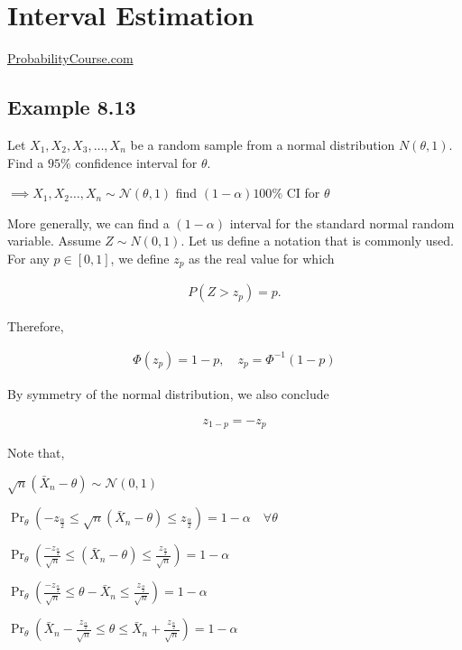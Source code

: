 \documentclass[12pt,a4paper]{article}
\author{Laxman Singh}
\date{\today}
\title{}
\begin{document}
 \section*{Interval Estimation} 
 \href{https://www.probabilitycourse.com/chapter8/8_3_0_interval_estimation.php}{ProbabilityCourse.com}
 
 \subsection*{Example 8.13}
 Let \(X_1, X_2, X_3, \ldots, X_n\) be a random sample from a normal distribution \(N(\theta, 1)\). Find a \(95 \%\) confidence interval for \(\theta\). 

 \(\implies X_{1},X_{2}\ldots,X_{n}\sim \mathcal{N}(\theta,1)\) find \((1-\alpha)100\% \) CI for \(\theta\) 
 
 More generally, we can find a \((1-\alpha)\) interval for the standard normal random variable. Assume \(Z \sim N(0,1)\). Let us define a notation that is commonly used. For any \(p \in[0,1]\), we define \(z_p\) as the real value for which

 \begin{align*}
 P\left(Z>z_p\right)=p .
 \end{align*}
 
 
 Therefore,
 
 \begin{align*}
 \Phi\left(z_p\right)=1-p, \quad z_p=\Phi^{-1}(1-p)
 \end{align*}
 
 
 By symmetry of the normal distribution, we also conclude
 
 \begin{align*}
 z_{1-p}=-z_p
 \end{align*}

 Note that,

 \(\sqrt{n}(\bar{X}_{n}-\theta)\sim \mathcal{N}(0,1)\)
 
 \(\Pr_{\theta} (-z_{\frac{\alpha}{2}}\leq \sqrt{n}(\bar{X}_{n}-\theta) \leq z_{\frac{\alpha}{2}})=1-\alpha \quad \forall \theta\)

 \(\Pr_{\theta}\left(\frac{-z_{\frac{\alpha}{2}}}{\sqrt{n}}\leq (\bar{X}_{n}-\theta) \leq \frac{z_{\frac{\alpha}{2}}}{\sqrt{n}}\right)=1-\alpha\)  

 \(\Pr_{\theta}\left(\frac{-z_{\frac{\alpha}{2}}}{\sqrt{n}}\leq \theta-\bar{X}_{n} \leq \frac{z_{\frac{\alpha}{2}}}{\sqrt{n}}\right)=1-\alpha\)  

 \(\Pr_{\theta}\left(\bar{X}_{n}-\frac{z_{\frac{\alpha}{2}}}{\sqrt{n}}\leq \theta \leq \bar{X}_{n}+\frac{z_{\frac{\alpha}{2}}}{\sqrt{n}}\right)=1-\alpha\)  
\end{document}
